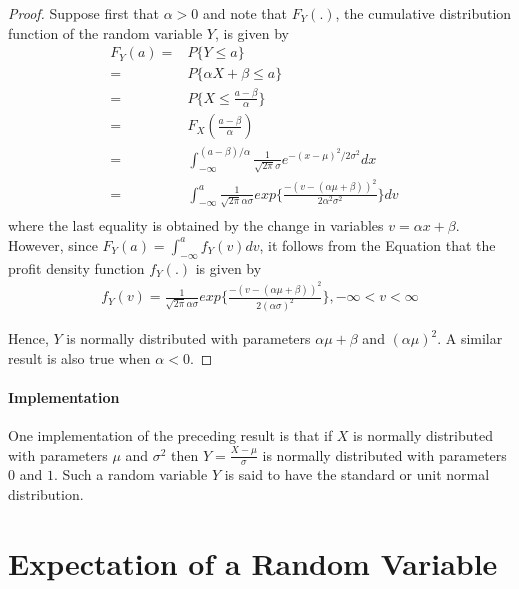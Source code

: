 \documentclass[10 pt,final]{article}
\newcommand{\impo}[1]{{\color{magenta} #1}}
\begin{document}
\begin{proof}
Suppose first that $\alpha >0$ and note that $F_Y(.)$, the cumulative distribution function of the random variable $Y$, is given by
\begin{align*}
F_Y(a) = & P\{ Y \leq a \} & \\
= & P\{\alpha X + \beta \leq a\} & \\
= & P\{ X \leq \frac{a - \beta}{\alpha}\} & \\
= & F_X(\frac{a-\beta}{\alpha}) & \\
= & \int_{-\infty}^{(a-\beta)/\alpha} \frac{1}{\sqrt{2 \pi} \sigma} e^{-(x-\mu)^2/2 \sigma^2} dx &\\
= &\int_{-\infty}^a \frac{1}{\sqrt{2 \pi} \alpha \sigma} exp\{ \frac{-(v-(\alpha \mu + \beta))^2}{2\alpha^2 \sigma^2}\} dv &\\
\end{align*}
where the last equality is obtained by the change in variables $v = \alpha x + \beta$. However, since $F_Y(a) = \int_{-\infty}^a f_Y(v) dv $, it follows from the Equation that the profit density function $f_Y(.)$ is given by 
\begin{align*}
f_Y(v) = \frac{1}{\sqrt{2 \pi} \alpha \sigma} exp\{ \frac{-(v-(\alpha \mu + \beta))^2}{2(\alpha \sigma)^2}\}, -\infty < v < \infty
\end{align*}

Hence, $Y$ is normally distributed with parameters $\alpha \mu + \beta$ and $(\alpha \mu)^2$. A similar result is also true when $\alpha < 0$.
\end{proof}

\paragraph{Implementation} One implementation of the preceding result is that if $X$ is normally distributed with parameters $\mu$ and $\sigma^2$ then $Y=\frac{X - \mu}{\sigma}$ is normally distributed with parameters $0$ and $1$. Such a random variable $Y$ is said to have the \impo{standard} or \impo{unit normal distribution}.
\section{Expectation of a Random Variable}

\end{document}
